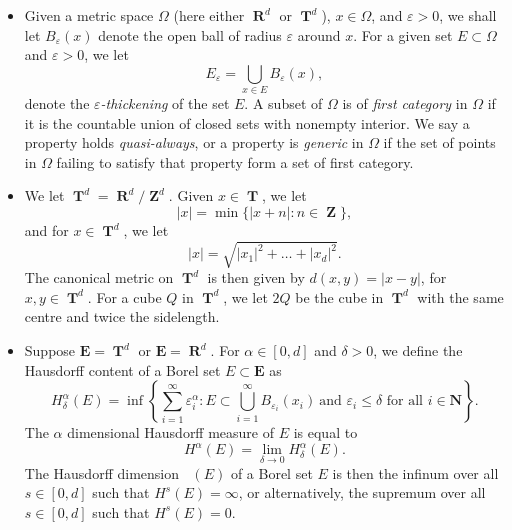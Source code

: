 \documentclass[12pt,reqno]{article}
\numberwithin{equation}{section}
\DeclareMathOperator{\hausdim}{\dim_{\mathbf{H}}}
\DeclareMathOperator{\RR}{\mathbf{R}}
\DeclareMathOperator{\ZZ}{\mathbf{Z}}
\DeclareMathOperator{\TT}{\mathbf{T}}
\begin{document}
\begin{itemize}

    \item Given a metric space $\Omega$ (here either $\RR^d$ or $\TT^d$), $x \in \Omega$, and $\varepsilon > 0$, we shall let $B_\varepsilon(x)$ denote the open ball of radius $\varepsilon$ around $x$. For a given set $E \subset \Omega$ and $\varepsilon > 0$, we let
    \[ E_\varepsilon = \bigcup_{x \in E} B_\varepsilon(x), \]
    denote the \emph{$\varepsilon$-thickening} of the set $E$. A subset of $\Omega$ is of \emph{first category} in $\Omega$ if it is the countable union of closed sets with nonempty interior. We say a property holds \emph{quasi-always}, or a property is \emph{generic} in $\Omega$ if the set of points in $\Omega$ failing to satisfy that property form a set of first category.

    \item We let $\TT^d = \RR^d/\ZZ^d$. Given $x \in \TT$, we let
    \[ |x| = \min \{ |x + n| : n \in \ZZ \}, \]
    and for $x \in \TT^d$, we let
    \[ |x| = \sqrt{|x_1|^2 + \dots + |x_d|^2}. \]
    The canonical metric on $\TT^d$ is then given by $d(x,y) = |x - y|$, for $x,y \in \TT^d$. For a cube $Q$ in $\TT^d$, we let $2Q$ be the cube in $\TT^d$ with the same centre and twice the sidelength.

    \item Suppose $\mathbf{E} = \TT^d$ or $\mathbf{E} = \RR^d$. For $\alpha \in [0,d]$ and $\delta > 0$, we define the Hausdorff content of a Borel set $E \subset \mathbf{E}$ as
    \[ H^\alpha_\delta(E) = \inf \left\{ \sum_{i = 1}^\infty \varepsilon_i^\alpha : E \subset \bigcup_{i = 1}^\infty B_{\varepsilon_i}(x_i)\ \text{and $\varepsilon_i \leq \delta$ for all $i \in \mathbf{N}$} \right\}. \]
    The $\alpha$ dimensional Hausdorff measure of $E$ is equal to
    \[ H^\alpha(E) = \lim_{\delta \to 0} H^\alpha_\delta(E). \]
    The Hausdorff dimension $\hausdim(E)$ of a Borel set $E$ is then the infinum over all $s \in [0,d]$ such that $H^s(E) = \infty$, or alternatively, the supremum over all $s \in [0,d]$ such that $H^s(E) = 0$.


\end{itemize}
\end{document}
